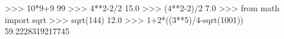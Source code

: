 >>> 10*9+9
99
>>> 4**2-2/2
15.0
>>> (4**2-2)/2
7.0
>>> from math import sqrt
>>> sqrt(144)
12.0
>>> 1+2*((3**5)/4-sqrt(1001))
59.2228319217745